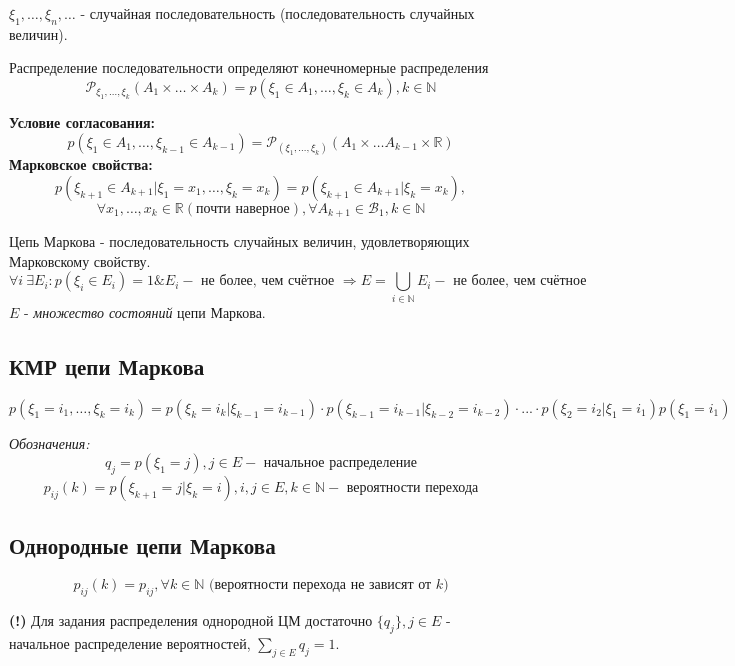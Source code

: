$\xi_1, \dots, \xi_n, \dots$ - случайная последовательность (последовательность случайных величин).
\begin{definition}
	Распределение последовательности определяют конечномерные распределения
	\[ \mathcal{P}_{\xi_1, \dots, \xi_k} (A_1 \times \dots \times A_k) = p(\xi_1 \in A_1, \dots, \xi_k \in A_k), k \in \mathbb{N} \]
\end{definition}

\noindent\textbf{Условие согласования:}
\[ p(\xi_1 \in A_1, \dots, \xi_{k-1} \in A_{k-1}) = \mathcal{P}_{(\xi_1, \dots, \xi_k)} (A_1 \times \dots A_{k-1} \times \mathbb{R}) \]
\noindent\textbf{Марковское свойства:}
\[ p(\xi_{k+1} \in A_{k+1} | \xi_1 = x_1, \dots, \xi_k = x_k) = p (\xi_{k+1} \in A_{k+1} | \xi_k = x_k),\]
\[\forall x_1, \dots, x_k \in \mathbb{R} (\text{почти наверное}), \forall A_{k+1} \in \mathcal{B}_1, k \in \mathbb{N} \]
\begin{definition}
	Цепь Маркова - последовательность случайных величин, удовлетворяющих Марковскому свойству.
	\[ \forall i ~ \exists E_i: p(\xi_i \in E_i) = 1 \& E_i - \text{ не более, чем счётное } \Rightarrow E = \bigcup_{i \in \mathbb{N}} E_i - \text{ не более, чем счётное} \]
	$E$ - \textit{множество состояний} цепи Маркова.
\end{definition}
\subsection{КМР цепи Маркова}

\[ p(\xi_1 = i_1, \dots, \xi_k = i_k) = p(\xi_k = i_k | \xi_{k-1} = i_{k-1}) \cdot p(\xi_{k-1} = i_{k-1} | \xi_{k-2} = i_{k-2}) \cdot ... \cdot p(\xi_2 = i_2 | \xi_1 = i_1) p(\xi_1 = i_1) \]

\noindent\textit{Обозначения:}
\[ q_j = p(\xi_1 = j), j \in E - \text{ начальное распределение} \]
\[ p_{ij} (k) = p(\xi_{k+1} = j | \xi_k = i), i,j \in E, k \in \mathbb{N} - \text{ вероятности перехода} \]

\subsection{Однородные цепи Маркова}
\[ p_{ij} (k) = p_{ij}, \forall k \in \mathbb{N} \text{ (вероятности перехода не зависят от } k) \]

\noindent\textbf{(!)} Для задания распределения однородной ЦМ достаточно $\{ q_j \}, j \in E$ - начальное распределение вероятностей, $\sum\limits_{j \in E} q_j = 1$.

